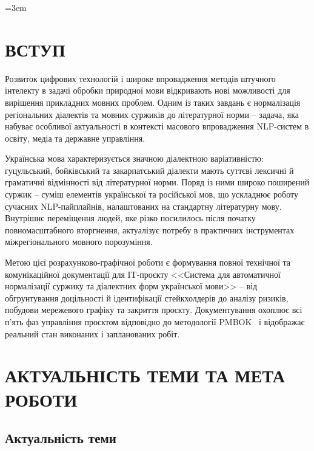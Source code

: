 \documentclass[14pt]{extarticle}
\begin{document}
\sloppy
\emergencystretch=3em
\setlength{\tabcolsep}{4pt}

\thispagestyle{empty}
\setcounter{page}{2}
\tableofcontents
\clearpage

\setcounter{page}{3}
\section*{ВСТУП}

Розвиток цифрових технологій і широке впровадження методів штучного інтелекту в задачі обробки природної мови відкривають нові можливості для вирішення прикладних мовних проблем. Одним із таких завдань є нормалізація регіональних діалектів та мовних суржиків до літературної норми -- задача, яка набуває особливої актуальності в контексті масового впровадження NLP-систем в освіту, медіа та державне управління.

Українська мова характеризується значною діалектною варіативністю: гуцульський, бойківський та закарпатський діалекти мають суттєві лексичні й граматичні відмінності від літературної норми. Поряд із ними широко поширений суржик -- суміш елементів української та російської мов, що ускладнює роботу сучасних NLP-пайплайнів, налаштованих на стандартну літературну мову. Внутрішнє переміщення людей, яке різко посилилось після початку повномасштабного вторгнення, актуалізує потребу в практичних інструментах міжрегіонального мовного порозуміння.

Метою цієї розрахунково-графічної роботи є формування повної технічної та комунікаційної документації для IT-проєкту <<Система для автоматичної нормалізації суржику та діалектних форм української мови>> -- від обгрунтування доцільності й ідентифікації стейкхолдерів до аналізу ризиків, побудови мережевого графіку та закриття проєкту. Документування охоплює всі п'ять фаз управління проєктом відповідно до методології PMBOK~\cite{pmbok} і відображає реальний стан виконаних і запланованих робіт.

\clearpage

\section{АКТУАЛЬНІСТЬ ТЕМИ ТА МЕТА РОБОТИ}

\subsection{Актуальність теми}
\end{document}
